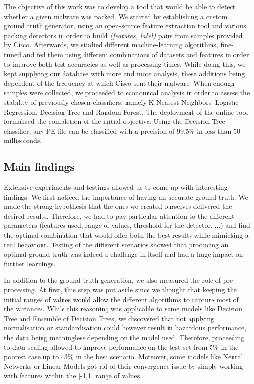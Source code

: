 The objective of this work was to develop a tool that would be able to detect whether a given malware was packed.
We started by establishing a custom ground truth generator, using an open-source feature extraction tool and various packing detectors in order to build \textit{(features, label)} pairs from samples provided by Cisco. Afterwards, we studied different machine-learning algorithms, fine-tuned and fed them using different combinations of datasets and features in order to improve both test accuracies as well as processing times. While doing this, we kept supplying our database with more and more analysis, these additions being dependent of the frequency at which Cisco sent their malware. When enough samples were collected, we proceeded to economical analysis in order to assess the stability of previously chosen classifiers, namely K-Nearest Neighbors, Logistic Regression, Decision Tree and Random Forest. The deployment of the online tool formalised the completion of the initial objective. Using the Decision Tree classifier, any PE file can be classified with a precision of 99.5\% in less than 50 milliseconds. 

\subsection*{Main findings}
Extensive experiments and testings allowed us to come up with interesting findings. 
We first noticed the importance of having an accurate ground truth. We made the strong hypothesis that the ones we created ourselves delivered the desired results. Therefore, we had to pay particular attention to the different parameters (features used, range of values, threshold for the detector, ...) and find the optimal combination that would offer both the best results while mimicking a real behaviour. Testing of the different scenarios showed that producing an optimal ground truth was indeed a challenge in itself and had a huge impact on further learnings.

In addition to the ground truth generation, we also measured the role of pre-processing. At first, this step was put aside since we thought that keeping the initial ranges of values would allow the different algorithms to capture most of the variances. While this reasoning was applicable to some models like Decision Tree and Ensemble of Decision Trees, we discovered that not applying normalisation or standardisation could however result in hazardous performance, the data being meaningless depending on the model used. Therefore, proceeding to data scaling allowed to improve performance on the test set from 5\% in the poorest case up to 43\% in the best scenario. Moreover, some models like Neural Networks or Linear Models got rid of their convergence issue by simply working with features within the [-1,1] range of values.

